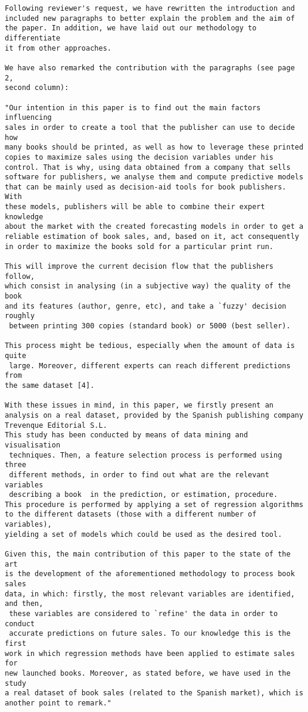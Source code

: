 \documentclass[preprint]{elsarticle}
\begin{document}
\begin{verbatim}
Following reviewer's request, we have rewritten the introduction and 
included new paragraphs to better explain the problem and the aim of 
the paper. In addition, we have laid out our methodology to differentiate 
it from other approaches.

We have also remarked the contribution with the paragraphs (see page 2,
second column):

"Our intention in this paper is to find out the main factors influencing
sales in order to create a tool that the publisher can use to decide how 
many books should be printed, as well as how to leverage these printed
copies to maximize sales using the decision variables under his
control. That is why, using data obtained from a company that sells
software for publishers, we analyse them and compute predictive models 
that can be mainly used as decision-aid tools for book publishers. With 
these models, publishers will be able to combine their expert knowledge 
about the market with the created forecasting models in order to get a 
reliable estimation of book sales, and, based on it, act consequently 
in order to maximize the books sold for a particular print run. 

This will improve the current decision flow that the publishers follow, 
which consist in analysing (in a subjective way) the quality of the book 
and its features (author, genre, etc), and take a `fuzzy' decision roughly
 between printing 300 copies (standard book) or 5000 (best seller).

This process might be tedious, especially when the amount of data is quite
 large. Moreover, different experts can reach different predictions from 
the same dataset [4].

With these issues in mind, in this paper, we firstly present an 
analysis on a real dataset, provided by the Spanish publishing company 
Trevenque Editorial S.L.
This study has been conducted by means of data mining and visualisation
 techniques. Then, a feature selection process is performed using three
 different methods, in order to find out what are the relevant variables
 describing a book  in the prediction, or estimation, procedure. 
This procedure is performed by applying a set of regression algorithms 
to the different datasets (those with a different number of variables), 
yielding a set of models which could be used as the desired tool. 

Given this, the main contribution of this paper to the state of the art 
is the development of the aforementioned methodology to process book sales 
data, in which: firstly, the most relevant variables are identified, and then,
 these variables are considered to `refine' the data in order to conduct
 accurate predictions on future sales. To our knowledge this is the first 
work in which regression methods have been applied to estimate sales for 
new launched books. Moreover, as stated before, we have used in the study 
a real dataset of book sales (related to the Spanish market), which is 
another point to remark."
\end{verbatim}
\end{document}

